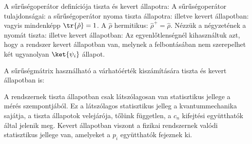    A sűrűségoperátor definíciója tiszta és kevert állapotra:
   A sűrűségoperátor tulajdonságai: a sűrűségoperátor nyoma tiszta állapotra:
   illetve kevert állapotban:
   vagyis mindenképp $\tr{\hat{\rho}}=1$.
   A $\hat\rho$ hermitikus: $\hat\rho^+=\hat\rho$.
   Nézzük a négyzetének a nyomát tiszta:
   illetve kevert állapotban:
   Az egyenlőtlenségnél kihasználtuk azt, hogy a rendszer kevert állapotban van, melynek a felbontásában nem szerepelhet két ugyanolyan $\ket{\psi_i}$ állapot. 
   
   A sűrűségmátrix használható a várhatóérték kiszámítására tiszta és kevert állapotban is:
   
   A rendszernek tiszta állapotban csak látszólagosan van statisztikus jellege a mérés szempontjából.
   Ez a látszólagos statisztikus jelleg a kvantummechanika sajátja, a tiszta állapotok velejárója, tőlünk független, a $c_n$ kifejtési együtthatók által jelenik meg.
   Kevert állapotban viszont a fizikai rendszernek valódi statisztikus jellege van, amelyeket a $p_i$ együtthatók fejeznek ki. 
   
